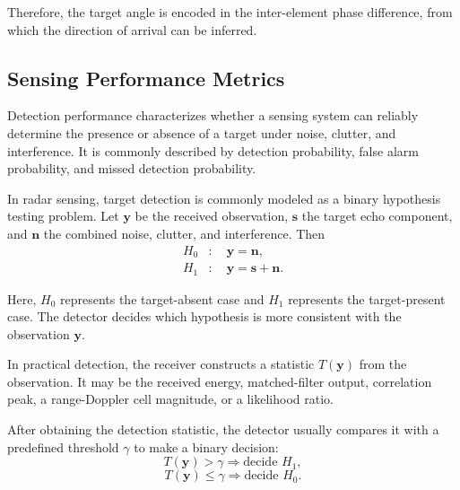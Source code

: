 Therefore, the target angle is encoded in the inter-element phase difference,
from which the direction of arrival can be inferred.

\subsection{Sensing Performance Metrics}

Detection performance characterizes whether a sensing system can reliably
determine the presence or absence of a target under noise, clutter, and
interference.
It is commonly described by detection probability, false alarm probability,
and missed detection probability.

In radar sensing, target detection is commonly modeled as a binary hypothesis
testing problem.
Let \(\mathbf{y}\) be the received observation, \(\mathbf{s}\) the target echo
component, and \(\mathbf{n}\) the combined noise, clutter, and interference.
Then
\begin{equation}
    \begin{aligned}
        H_0 &: \quad \mathbf{y}=\mathbf{n}, \\
        H_1 &: \quad \mathbf{y}=\mathbf{s}+\mathbf{n}.
    \end{aligned}
    \label{eq:radar_binary_detection_model}
\end{equation}

Here, \(H_0\) represents the target-absent case and \(H_1\) represents the
target-present case.
The detector decides which hypothesis is more consistent with the observation
\(\mathbf{y}\).

In practical detection, the receiver constructs a statistic \(T(\mathbf{y})\)
from the observation.
It may be the received energy, matched-filter output, correlation peak, a
range-Doppler cell magnitude, or a likelihood ratio.

After obtaining the detection statistic, the detector usually compares it with
a predefined threshold \(\gamma\) to make a binary decision:
\begin{equation}
    T(\mathbf{y})>\gamma \Rightarrow \text{decide } H_1,
    \label{eq:detection_decision_h1}
\end{equation}
\begin{equation}
    T(\mathbf{y})\leq\gamma \Rightarrow \text{decide } H_0.
    \label{eq:detection_decision_h0}
\end{equation}

